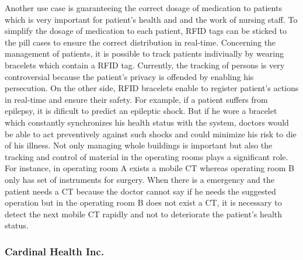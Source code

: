 Another use case is guaranteeing the correct dosage of medication to patients which is very important for patient's health and and the work of nursing staff. To simplify the dosage of medication to each patient, RFID tags can be sticked to the pill cases to ensure the correct distribution in real-time. 
Concerning the management of patients, it is possible to track patients indiviually by wearing bracelets which contain a RFID tag. Currently, the tracking of persons is very controversial because the patient's privacy is offended by enabling his persecution. On the other side, RFID bracelets enable to register patient's actions in real-time and ensure their safety. For example, if a patient suffers from epilepsy, it is dificult to predict an epileptic shock. But if he wore a bracelet which constantly synchronizes his health status with the system, doctors would be able to act preventively against such shocks and could minimize his risk to die of his illness.
Not only managing whole buildings is important but also the tracking and control of material in the operating rooms plays a significant role. For instance, in operating room A exists a mobile \ac{CT} whereas operating room B only has set of instruments for surgery. When there is a emergency and the patient needs a CT because the doctor cannot say if he needs the suggested operation but in the operating room B does not exist a CT, it is necessary to detect the next mobile CT rapidly and not to deteriorate the patient's health status. 

\subsubsection{Cardinal Health Inc.}

